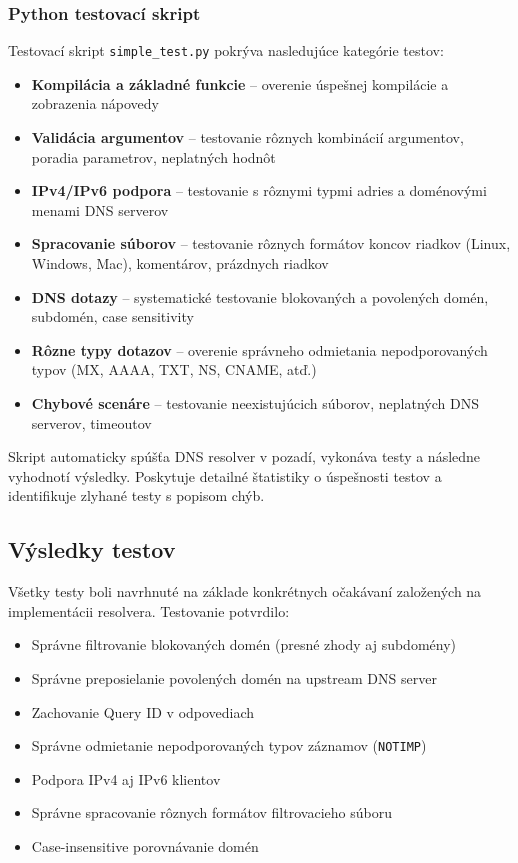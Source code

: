 \documentclass[12pt,a4paper]{article}
\begin{document}
\subsubsection{Python testovací skript}

Testovací skript \texttt{simple\_test.py} pokrýva nasledujúce kategórie testov:

\begin{itemize}
    \item \textbf{Kompilácia a základné funkcie} -- overenie úspešnej kompilácie a zobrazenia nápovedy
    \item \textbf{Validácia argumentov} -- testovanie rôznych kombinácií argumentov, poradia parametrov, neplatných hodnôt
    \item \textbf{IPv4/IPv6 podpora} -- testovanie s rôznymi typmi adries a doménovými menami DNS serverov
    \item \textbf{Spracovanie súborov} -- testovanie rôznych formátov koncov riadkov (Linux, Windows, Mac), komentárov, prázdnych riadkov
    \item \textbf{DNS dotazy} -- systematické testovanie blokovaných a povolených domén, subdomén, case sensitivity
    \item \textbf{Rôzne typy dotazov} -- overenie správneho odmietania nepodporovaných typov (MX, AAAA, TXT, NS, CNAME, atď.)
    \item \textbf{Chybové scenáre} -- testovanie neexistujúcich súborov, neplatných DNS serverov, timeoutov
\end{itemize}

Skript automaticky spúšťa DNS resolver v pozadí, vykonáva testy a následne vyhodnotí výsledky. Poskytuje detailné štatistiky o úspešnosti testov a identifikuje zlyhané testy s popisom chýb.

\subsection{Výsledky testov}

Všetky testy boli navrhnuté na základe konkrétnych očakávaní založených na implementácii resolvera. Testovanie potvrdilo:

\begin{itemize}
    \item Správne filtrovanie blokovaných domén (presné zhody aj subdomény)
    \item Správne preposielanie povolených domén na upstream DNS server
    \item Zachovanie Query ID v odpovediach
    \item Správne odmietanie nepodporovaných typov záznamov (\texttt{NOTIMP})
    \item Podpora IPv4 aj IPv6 klientov
    \item Správne spracovanie rôznych formátov filtrovacieho súboru
    \item Case-insensitive porovnávanie domén
\end{itemize}
\end{document}
